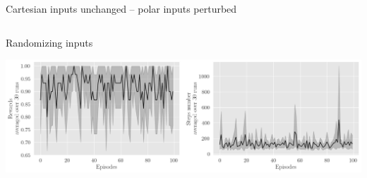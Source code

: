 \documentclass[bigger]{beamer}
\begin{document}
\begin{frame}[label={sec:org522d681}]{Cartesian inputs unchanged -- polar inputs perturbed}
\begin{columns}
\begin{column}[c]{0.5\columnwidth}
\begin{center}
\end{center}
\begin{center}
\footnotesize
Randomizing inputs
\end{center}
\begin{center}
\includegraphics[width=\textwidth]{medias/LeftRight/exp_keep-cartesian_silence-False.png}
\end{center}
\end{column}
\end{columns}
\end{frame}
\end{document}

